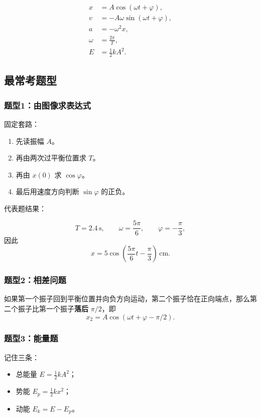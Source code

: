 \documentclass[12pt,a4paper]{article}
\newcommand{\key}[1]{\textcolor{blue!60!black}{\textbf{#1}}}
\begin{document}
\begin{align*}
x &= A\cos(\omega t + \varphi),\\
v &= -A\omega \sin(\omega t + \varphi),\\
a &= -\omega^2 x,\\
\omega &= \frac{2\pi}{T},\\
E &= \frac12 kA^2.
\end{align*}

\subsection{最常考题型}

\subsubsection*{题型1：由图像求表达式}

固定套路：

\begin{enumerate}
  \item 先读振幅 $A$。
  \item 再由两次过平衡位置求 $T$。
  \item 再由 $x(0)$ 求 $\cos\varphi$。
  \item 最后用速度方向判断 $\sin\varphi$ 的正负。
\end{enumerate}

代表题结果：

\[
T=2.4\,\mathrm{s},\qquad
\omega=\frac{5\pi}{6},\qquad
\varphi=-\frac{\pi}{3},
\]
因此
\[
x = 5\cos\left(\frac{5\pi}{6}t-\frac{\pi}{3}\right)\,\mathrm{cm}.
\]

\subsubsection*{题型2：相差问题}

如果第一个振子回到平衡位置并向负方向运动，第二个振子恰在正向端点，那么第二个振子比第一个振子\key{落后} $\pi/2$，即
\[
x_2 = A\cos(\omega t + \varphi - \pi/2).
\]

\subsubsection*{题型3：能量题}

记住三条：

\begin{itemize}
  \item 总能量 $E=\frac12 kA^2$；
  \item 势能 $E_p=\frac12 kx^2$；
  \item 动能 $E_k=E-E_p$。
\end{itemize}
\end{document}
